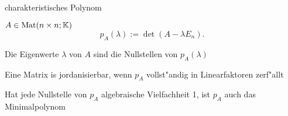\documentclass[class=article, crop=false]{standalone}
\begin{document}
\begin{zettel}{charakteristisches Polynom}
\begin{flashcard}[]{}
	\begin{definition}
		$A \in \operatorname{Mat}(n \times n; \mathbb{K}) $
		\[
			p_{A}(\lambda ) := \det(A - \lambda E_{n})
		.\]
	\end{definition}
\end{flashcard}

Die Eigenwerte $\lambda$ von $A$ sind die Nullstellen von $p_{A}(\lambda)$

Eine Matrix is jordanisierbar, wenn $p_{A}$ vollst"andig in Linearfaktoren zerf"allt

Hat jede Nullstelle von $p_{A}$ algebraische Vielfachheit 1, ist $p_{A}$ auch das Minimalpolynom
\end{zettel}
\end{document}
